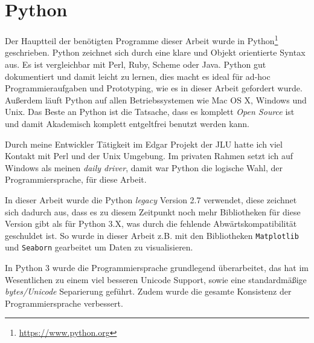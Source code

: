 


\section{Python}
Der Hauptteil der benötigten Programme dieser Arbeit wurde in Python\footnote{\url{https://www.python.org}} geschrieben. Python zeichnet sich durch eine klare und Objekt orientierte Syntax aus. Es ist vergleichbar mit Perl, Ruby, Scheme oder Java. Python gut dokumentiert und damit leicht zu lernen, dies macht es ideal für ad-hoc Programmieraufgaben und Prototyping, wie es in dieser Arbeit gefordert wurde. Außerdem läuft Python auf allen Betriebssystemen wie Mac OS X, Windows und Unix. Das Beste an Python ist die Tatsache, dass es komplett \emph{Open Source} ist und damit Akademisch komplett entgeltfrei benutzt werden kann.

Durch meine Entwickler Tätigkeit im Edgar \cite{Yu.2017} Projekt der JLU hatte ich viel Kontakt mit Perl und der Unix Umgebung. Im privaten Rahmen setzt ich auf Windows als meinen \emph{daily driver}, damit war Python die logische Wahl, der Programmiersprache, für diese Arbeit.

In dieser Arbeit wurde die Python \emph{legacy} Version 2.7 verwendet, diese zeichnet sich dadurch aus, dass es zu diesem Zeitpunkt noch mehr Bibliotheken für diese Version gibt als für Python 3.X, was durch die fehlende Abwärtskompatibilität geschuldet ist. So wurde in dieser Arbeit z.B. mit den Bibliotheken \texttt{Matplotlib} und \texttt{Seaborn} gearbeitet um Daten zu visualisieren.

In Python 3 wurde die Programmiersprache grundlegend überarbeitet, das hat im Wesentlichen zu einem viel besseren Unicode Support, sowie eine standardmäßige \emph{bytes/Unicode} Separierung geführt. Zudem wurde die gesamte Konsistenz der Programmiersprache verbessert.


